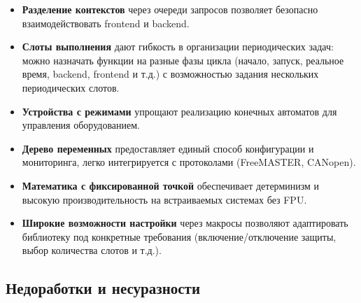 \documentclass[a4paper,12pt]{article}
\begin{document}
\begin{itemize}
    \item \textbf{Разделение контекстов} через очереди запросов позволяет безопасно взаимодействовать frontend и backend.
    \item \textbf{Слоты выполнения} дают гибкость в организации периодических задач: можно назначать функции на разные фазы цикла (начало, запуск, реальное время, backend, frontend и т.д.) с возможностью задания нескольких периодических слотов.
    \item \textbf{Устройства с режимами} упрощают реализацию конечных автоматов для управления оборудованием.
    \item \textbf{Дерево переменных} предоставляет единый способ конфигурации и мониторинга, легко интегрируется с протоколами (FreeMASTER, CANopen).
    \item \textbf{Математика с фиксированной точкой} обеспечивает детерминизм и высокую производительность на встраиваемых системах без FPU.
    \item \textbf{Широкие возможности настройки} через макросы позволяют адаптировать библиотеку под конкретные требования (включение/отключение защиты, выбор количества слотов и т.д.).
\end{itemize}

\subsection{Недоработки и несуразности}
\end{document}
